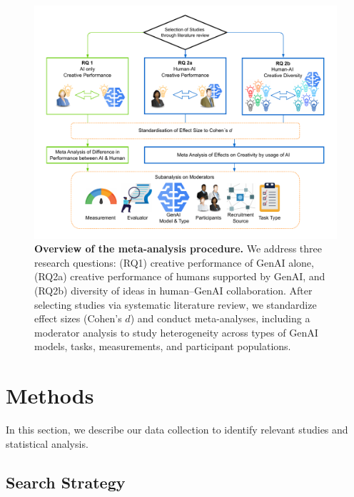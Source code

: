 \documentclass[manuscript, screen, review, acmsmall, anonymous]{acmart}
\begin{document}
\begin{figure}
  \centering
  \includegraphics[width=0.9\linewidth]{overview.pdf}
  \caption{\textbf{Overview of the meta-analysis procedure.} We address three research questions: (RQ1) creative performance of GenAI alone, (RQ2a) creative performance of humans supported by GenAI, and (RQ2b) diversity of ideas in human–GenAI collaboration. After selecting studies via systematic literature review, we standardize effect sizes (Cohen’s $d$) and conduct meta-analyses, including a moderator analysis to study heterogeneity across types of GenAI models, tasks, measurements, and participant populations.}
\end{figure}


\section{Methods}
\label{sec:Methods}

In this section, we describe our data collection to identify relevant studies and statistical analysis. 

\subsection{Search Strategy}
\end{document}
